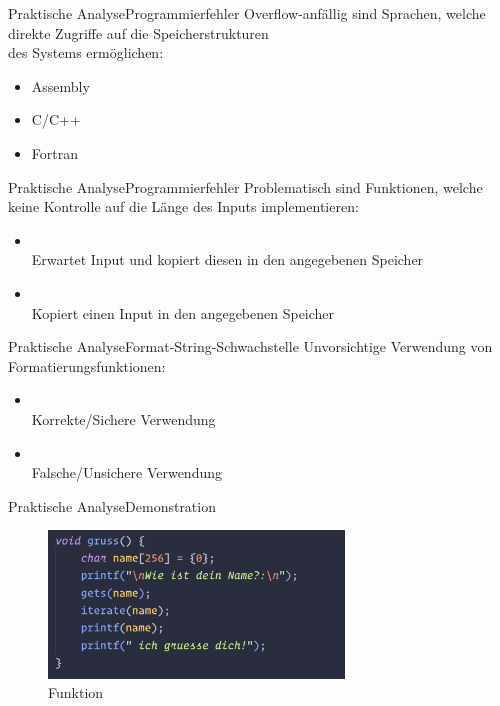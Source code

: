 \begin{frame}{Praktische Analyse}{Programmierfehler}
    Overflow-anfällig sind Sprachen, welche direkte Zugriffe auf die Speicherstrukturen\\ des Systems ermöglichen:
    \begin{itemize}
        \vspace{1em}
        \item Assembly
        \item C/C++
        \item Fortran
    \end{itemize}
\end{frame}

\begin{frame}{Praktische Analyse}{Programmierfehler}
    Problematisch sind Funktionen, welche
    keine Kontrolle auf die Länge des Inputs implementieren: %
    \begin{itemize}
        \vspace{1em}
        \item {}\\ Erwartet Input und kopiert diesen in den angegebenen Speicher
        \vspace{1em}
        \item {}\\ Kopiert einen Input
        in den angegebenen Speicher
    \end{itemize}
\end{frame}


\begin{frame}{Praktische Analyse}{Format-String-Schwachstelle}
    Unvorsichtige Verwendung von Formatierungsfunktionen:
    \begin{itemize}
        \vspace{1em}
    \item {}\\ Korrekte/Sichere Verwendung
     \vspace{1em}
    \item {}\\ Falsche/Unsichere Verwendung
    \end{itemize}
\end{frame}

\begin{frame}{Praktische Analyse}{Demonstration}
    \begin{figure}[h]
        \centering
        \includegraphics[width=0.7\textwidth,height=0.75\textheight,keepaspectratio]{images/gruss.png}
        \caption{Funktion  }
    \end{figure}
\end{frame}

